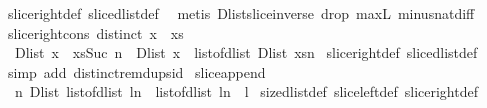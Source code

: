 \begin{isabellebody}
%
\isadelimproof
%
\endisadelimproof
%
\isatagproof
{}\isamarkupfalse%
\ slice{\isacharunderscore}right{\isacharunderscore}def\ slice{\isacharunderscore}dlist{\isacharunderscore}def\ \isanewline
{}\isamarkupfalse%
\ {\isacharparenleft}metis\ Dlist{\isacharunderscore}slice{\isacharunderscore}inverse\ drop{\isacharunderscore}{}\ max{\isacharunderscore}{}L\ minus{\isacharunderscore}nat{\isachardot}diff{\isacharunderscore}{}{\isacharparenright}%
\endisatagproof
{\isafoldproof}%
%
\isadelimproof
\isanewline
%
\endisadelimproof
\isanewline
{}\isamarkupfalse%
\ slice{\isacharunderscore}right{\isacharunderscore}cons{\isacharcolon}\ {\isachardoublequoteopen}distinct\ {\isacharparenleft}x\ {\isacharhash}\ xs{\isacharparenright}\ {\isasymLongrightarrow}\ \isanewline
\ \ {\isacharparenleft}Dlist\ {\isacharparenleft}x\ {\isacharhash}\ xs{\isacharparenright}{\isacharparenright}{\isasymdagger}{\isachardot}{\isachardot}{\isacharparenleft}Suc\ n{\isacharparenright}\ {\isacharequal}\ Dlist\ {\isacharparenleft}x\ {\isacharhash}\ {\isacharparenleft}list{\isacharunderscore}of{\isacharunderscore}dlist\ {\isacharparenleft}{\isacharparenleft}Dlist\ xs{\isacharparenright}{\isasymdagger}{\isachardot}{\isachardot}n{\isacharparenright}{\isacharparenright}{\isacharparenright}{\isachardoublequoteclose}\isanewline
%
\isadelimproof
%
\endisadelimproof
%
\isatagproof
{}\isamarkupfalse%
\ slice{\isacharunderscore}right{\isacharunderscore}def\ slice{\isacharunderscore}dlist{\isacharunderscore}def\isanewline
{}\isamarkupfalse%
\ {\isacharparenleft}simp\ add{\isacharcolon}\ distinct{\isacharunderscore}remdups{\isacharunderscore}id{\isacharparenright}%
\endisatagproof
{\isafoldproof}%
%
\isadelimproof
\isanewline
%
\endisadelimproof
\isanewline
{}\isamarkupfalse%
\ slice{\isacharunderscore}append{\isacharcolon}\ \isanewline
\ \ {\isachardoublequoteopen}{\isasymforall}n{\isachardot}\ Dlist\ {\isacharparenleft}{\isacharparenleft}list{\isacharunderscore}of{\isacharunderscore}dlist\ {\isacharparenleft}l{\isasymdagger}{\isachardot}{\isachardot}n{\isacharparenright}{\isacharparenright}\ {\isacharat}\ {\isacharparenleft}list{\isacharunderscore}of{\isacharunderscore}dlist\ {\isacharparenleft}l{\isasymdagger}n{\isachardot}{\isachardot}{\isacharparenright}{\isacharparenright}{\isacharparenright}\ {\isacharequal}\ l{\isachardoublequoteclose}\isanewline
%
\isadelimproof
%
\endisadelimproof
%
\isatagproof
{}\isamarkupfalse%
\ size{\isacharunderscore}dlist{\isacharunderscore}def\ slice{\isacharunderscore}left{\isacharunderscore}def\ slice{\isacharunderscore}right{\isacharunderscore}def\isanewline

\end{isabellebody}
